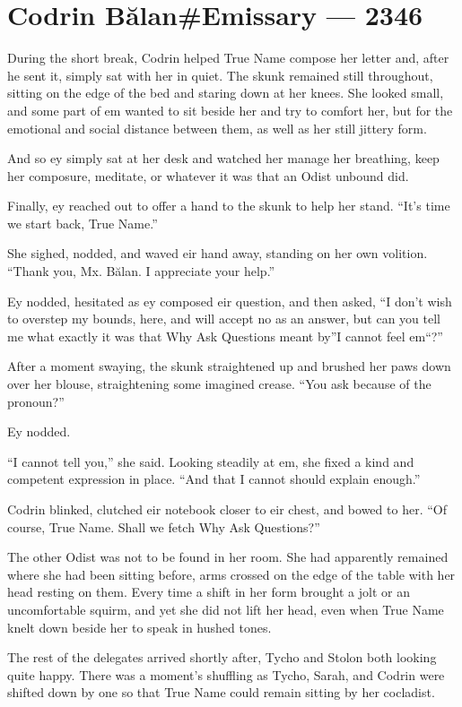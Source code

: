 \hypertarget{codrin-bux103lanemissary-2346}{%
\chapter{Codrin Bălan\#Emissary — 2346}\label{codrin-bux103lanemissary-2346}}

During the short break, Codrin helped True Name compose her letter and, after he sent it, simply sat with her in quiet. The skunk remained still throughout, sitting on the edge of the bed and staring down at her knees. She looked small, and some part of em wanted to sit beside her and try to comfort her, but for the emotional and social distance between them, as well as her still jittery form.

And so ey simply sat at her desk and watched her manage her breathing, keep her composure, meditate, or whatever it was that an Odist unbound did.

Finally, ey reached out to offer a hand to the skunk to help her stand. ``It's time we start back, True Name.''

She sighed, nodded, and waved eir hand away, standing on her own volition. ``Thank you, Mx. Bălan. I appreciate your help.''

Ey nodded, hesitated as ey composed eir question, and then asked, ``I don't wish to overstep my bounds, here, and will accept no as an answer, but can you tell me what exactly it was that Why Ask Questions meant by''I cannot feel em``?''

After a moment swaying, the skunk straightened up and brushed her paws down over her blouse, straightening some imagined crease. ``You ask because of the pronoun?''

Ey nodded.

``I cannot tell you,'' she said. Looking steadily at em, she fixed a kind and competent expression in place. ``And that I cannot should explain enough.''

Codrin blinked, clutched eir notebook closer to eir chest, and bowed to her. ``Of course, True Name. Shall we fetch Why Ask Questions?''

The other Odist was not to be found in her room. She had apparently remained where she had been sitting before, arms crossed on the edge of the table with her head resting on them. Every time a shift in her form brought a jolt or an uncomfortable squirm, and yet she did not lift her head, even when True Name knelt down beside her to speak in hushed tones.

The rest of the delegates arrived shortly after, Tycho and Stolon both looking quite happy. There was a moment's shuffling as Tycho, Sarah, and Codrin were shifted down by one so that True Name could remain sitting by her cocladist.

